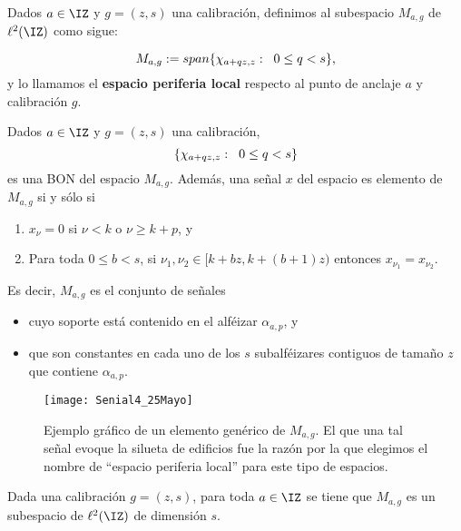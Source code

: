 \begin{defi} 
\label{definición de espacio M a g}
Dados $a \in \IZ$ y $g=(z,s)$
una calibración,
definimos al subespacio $M_{a,g}$
de $\ell^{2}(\IZ)$ como sigue:

\[
M_{a,g}:= span \{ \chi_{a+qz, z}: \hspace{0.2cm} 0 \leq q <s \},
\]
y lo llamamos el \textbf{espacio periferia local}
respecto al punto de anclaje $a$ y calibración $g$.
\end{defi}

\begin{obs} \label{prop: BON1 de Lambda g, k}
Dados $a \in \IZ$ y $g=(z,s)$ una calibración, 
\begin{equation}
\label{eq1: 22Nov}
\{ \chi_{a+qz, z}: \hspace{0.2cm} 0 \leq q <s \}
\end{equation}
es una BON del espacio $M_{a,g}$. Además,
una señal $x$ del espacio es elemento de $M_{a,g}$ si y 
sólo si 
\begin{enumerate}
\item $x_{\nu}=0$ si $\nu < k$ o $\nu \geq k+p$, y
\item Para toda $0 \leq b < s$, si 
$\nu_{1} , \nu_{2} \in [k+bz , k+(b+1)z) $ 
entonces $x_{\nu_{1}}=x_{\nu_{2}}$.
\end{enumerate}
Es decir, $M_{a,g}$ es el conjunto de señales
\begin{itemize}
\item cuyo soporte está contenido en el alféizar
$\alpha_{a, p}$, y

\item que son constantes en cada uno de los $s$ 
subalféizares contiguos de tamaño $z$ que contiene
$\alpha_{a, p}$.
\end{itemize}
\end{obs}



\begin{figure}[H]
	\centering
	\texttt{[image: Senial4\_25Mayo]}
	\caption{Ejemplo gráfico de un elemento
	genérico de $M_{a, g}$.
	El que una tal señal evoque la silueta de edificios
	fue la razón por la que elegimos el nombre 
	de ``espacio periferia local'' para este
	tipo de espacios.}
\end{figure}


\begin{cor} \label{cor:dimension de Lambda g,k }
Dada una calibración $g=(z,s)$, para toda $a\in \IZ$
se tiene que
$M_{a,g}$ es un subespacio de $\ell^{2}(\IZ)$
de dimensión $s$.
\end{cor}

